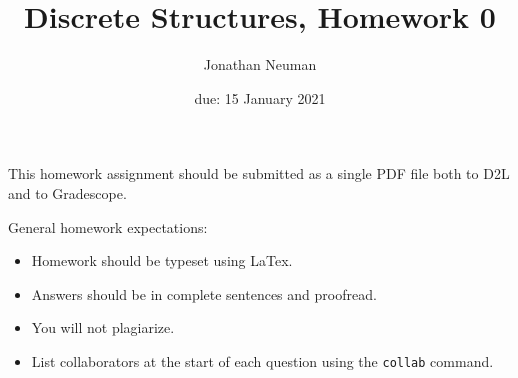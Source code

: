 \documentclass{article}
\title{Discrete Structures, Homework 0}
\author{Jonathan Neuman}
\date{due: 15 January 2021}
\begin{document}
\maketitle

This homework assignment should be
submitted as a single PDF file both to D2L and to Gradescope.

General homework expectations:
\begin{itemize}
    \item Homework should be typeset using LaTex.
    \item Answers should be in complete sentences and proofread.
    \item You will not plagiarize.
    \item List collaborators at the start of each question using the
        \texttt{collab} command.
\end{itemize}

\end{document}
